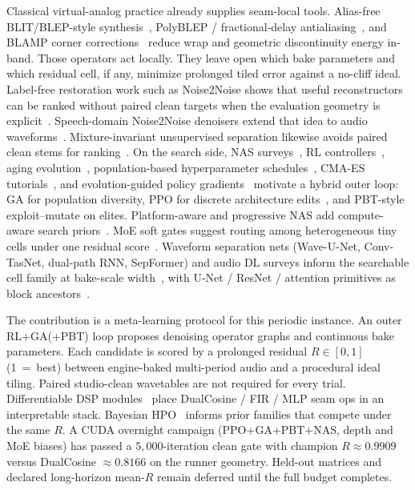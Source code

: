 Classical virtual-analog practice already supplies seam-local tools.
Alias-free BLIT/BLEP-style synthesis~\cite{stilson1996}, PolyBLEP / fractional-delay antialiasing~\cite{nam2009polyblep}, and BLAMP corner corrections~\cite{esqueda2016blamp} reduce wrap and geometric discontinuity energy in-band.
Those operators act locally.
They leave open which bake parameters and which residual cell, if any, minimize prolonged tiled error against a no-cliff ideal.
Label-free restoration work such as Noise2Noise shows that useful reconstructors can be ranked without paired clean targets when the evaluation geometry is explicit~\cite{lehtinen2018}.
Speech-domain Noise2Noise denoisers extend that idea to audio waveforms~\cite{kashyap2021n2n}.
Mixture-invariant unsupervised separation likewise avoids paired clean stems for ranking~\cite{wisdom2020}.
On the search side, NAS surveys~\cite{elsken2019}, RL controllers~\cite{zoph2017nas,pham2018}, aging evolution~\cite{real2017large,real2019}, population-based hyperparameter schedules~\cite{jaderberg2017}, CMA-ES tutorials~\cite{hansen2016cmaes}, and evolution-guided policy gradients~\cite{khadka2018} motivate a hybrid outer loop: GA for population diversity, PPO for discrete architecture edits~\cite{schulman2017}, and PBT-style exploit--mutate on elites.
Platform-aware and progressive NAS add compute-aware search priors~\cite{tan2019mnasnet,liu2018pnas}.
MoE soft gates suggest routing among heterogeneous tiny cells under one residual score~\cite{shazeer2017}.
Waveform separation nets (Wave-U-Net, Conv-TasNet, dual-path RNN, SepFormer) and audio DL surveys inform the searchable cell family at bake-scale width~\cite{stoller2018,macartney2018,luo2019,luo2020dprnn,subakan2021,purwins2019,gong2021ast}, with U-Net / ResNet / attention primitives as block ancestors~\cite{ronneberger2015,he2016resnet,vaswani2017,jansson2017}.

The contribution is a meta-learning protocol for this periodic instance.
An outer RL+GA(+PBT) loop proposes denoising operator graphs and continuous bake parameters.
Each candidate is scored by a prolonged residual $R\in[0,1]$ (1~=~best) between engine-baked multi-period audio and a procedural ideal tiling.
Paired studio-clean wavetables are not required for every trial.
Differentiable DSP modules~\cite{engel2020} place DualCosine / FIR / MLP seam ops in an interpretable stack.
Bayesian HPO~\cite{snoek2012} informs prior families that compete under the same $R$.
A CUDA overnight campaign (PPO+GA+PBT+NAS, depth and MoE biases) has passed a $5{,}000$-iteration clean gate with champion $R\approx 0.9909$ versus DualCosine $\approx 0.8166$ on the runner geometry.
Held-out matrices and declared long-horizon mean-$R$ remain deferred until the full budget completes.

